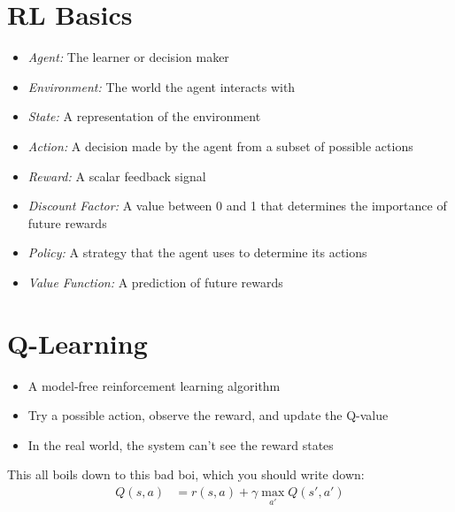 \documentclass[10pt]{report}
\begin{document}
\section{RL Basics}
\begin{itemize}
  \item \textit{Agent:} The learner or decision maker
  \item \textit{Environment:} The world the agent interacts with
  \item \textit{State:} A representation of the environment
  \item \textit{Action:} A decision made by the agent from a subset of possible actions
  \item \textit{Reward:} A scalar feedback signal
  \item \textit{Discount Factor:} A value between 0 and 1 that determines the importance of future rewards
  \item \textit{Policy:} A strategy that the agent uses to determine its actions
  \item \textit{Value Function:} A prediction of future rewards
\end{itemize}

\section{Q-Learning}
\begin{itemize}
  \item A model-free reinforcement learning algorithm
  \item Try a possible action, observe the reward, and update the Q-value
  \item In the real world, the system can't see the reward states
\end{itemize}

This all boils down to this bad boi, which you should write down:
\begin{align*}
  Q(s, a) &= r(s,a) + \gamma \max_{a'} Q(s', a')
\end{align*}
\end{document}
